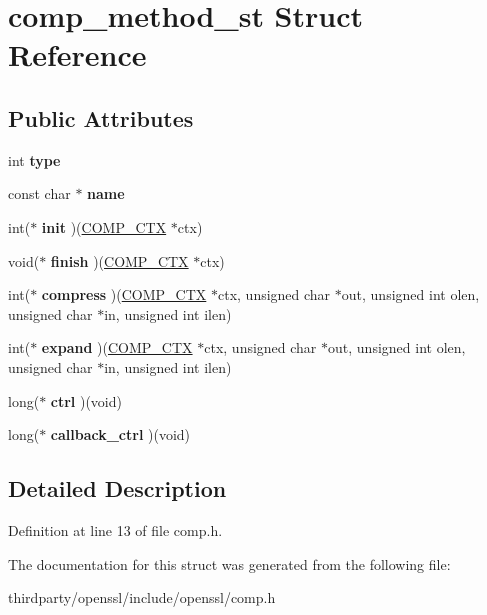 \hypertarget{structcomp__method__st}{}\section{comp\+\_\+method\+\_\+st Struct Reference}
\label{structcomp__method__st}
\subsection*{Public Attributes}
\begin{DoxyCompactItemize}
\item 
\mbox{\label{structcomp__method__st_a398382b23088b56dc05184016dfe247c}} 
int {\bfseries type}
\item 
\mbox{\label{structcomp__method__st_a2331b9bae2f1539bab8e75efc58283b1}} 
const char $\ast$ {\bfseries name}
\item 
\mbox{\label{structcomp__method__st_af175cb97f5906c4298b88c65507a8a64}} 
int($\ast$ {\bfseries init} )(\hyperlink{structcomp__ctx__st}{C\+O\+M\+P\+\_\+\+C\+TX} $\ast$ctx)
\item 
\mbox{\label{structcomp__method__st_af6a0a033a48d84fad2cfd6776f4c2dfc}} 
void($\ast$ {\bfseries finish} )(\hyperlink{structcomp__ctx__st}{C\+O\+M\+P\+\_\+\+C\+TX} $\ast$ctx)
\item 
\mbox{\label{structcomp__method__st_ad894ddf63c5ec8904fc9ea47d138fbac}} 
int($\ast$ {\bfseries compress} )(\hyperlink{structcomp__ctx__st}{C\+O\+M\+P\+\_\+\+C\+TX} $\ast$ctx, unsigned char $\ast$out, unsigned int olen, unsigned char $\ast$in, unsigned int ilen)
\item 
\mbox{\label{structcomp__method__st_a553b3c0860205e265266e958eba563af}} 
int($\ast$ {\bfseries expand} )(\hyperlink{structcomp__ctx__st}{C\+O\+M\+P\+\_\+\+C\+TX} $\ast$ctx, unsigned char $\ast$out, unsigned int olen, unsigned char $\ast$in, unsigned int ilen)
\item 
\mbox{\label{structcomp__method__st_a1759ea60f1c12ec6d9489855b78b1463}} 
long($\ast$ {\bfseries ctrl} )(void)
\item 
\mbox{\label{structcomp__method__st_a56f1252386d5b98a5560b1ada313ce09}} 
long($\ast$ {\bfseries callback\+\_\+ctrl} )(void)
\end{DoxyCompactItemize}


\subsection{Detailed Description}


Definition at line 13 of file comp.\+h.



The documentation for this struct was generated from the following file\+:\begin{DoxyCompactItemize}
\item 
thirdparty/openssl/include/openssl/comp.\+h\end{DoxyCompactItemize}
